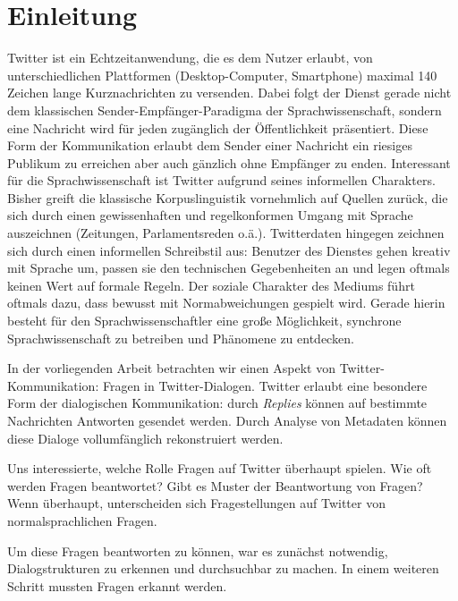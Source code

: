 \documentclass[main.tex]{subfiles}
\begin{document}
\section{Einleitung}

Twitter ist ein Echtzeitanwendung, die es dem Nutzer erlaubt, von unterschiedlichen Plattformen (Desktop-Computer, Smartphone) maximal 140 Zeichen lange Kurznachrichten zu versenden. Dabei folgt der Dienst gerade nicht dem klassischen Sender-Empfänger-Paradigma der Sprachwissenschaft, sondern eine Nachricht wird für jeden zugänglich der Öffentlichkeit präsentiert. Diese Form der Kommunikation erlaubt dem Sender einer Nachricht ein riesiges Publikum zu erreichen aber auch gänzlich ohne Empfänger zu enden. 
Interessant für die Sprachwissenschaft ist Twitter aufgrund seines informellen Charakters. Bisher greift die klassische Korpuslinguistik vornehmlich auf Quellen zurück, die sich durch einen gewissenhaften und regelkonformen Umgang mit Sprache auszeichnen (Zeitungen, Parlamentsreden o.ä.). Twitterdaten hingegen zeichnen sich durch einen informellen Schreibstil aus: Benutzer des Dienstes gehen kreativ mit Sprache um, passen sie den technischen Gegebenheiten an und legen oftmals keinen Wert auf formale Regeln. Der soziale Charakter des Mediums führt oftmals dazu, dass bewusst mit Normabweichungen gespielt wird. Gerade hierin besteht für den Sprachwissenschaftler eine große Möglichkeit, synchrone Sprachwissenschaft zu betreiben und Phänomene zu entdecken.

In der vorliegenden Arbeit betrachten wir einen Aspekt von Twitter-Kommunikation: Fragen in Twitter-Dialogen. Twitter erlaubt eine besondere Form der dialogischen Kommunikation: durch \textit{Replies} können auf bestimmte Nachrichten Antworten gesendet werden. Durch Analyse von Metadaten können diese Dialoge vollumfänglich rekonstruiert werden.

Uns interessierte, welche Rolle Fragen auf Twitter überhaupt spielen. Wie oft werden Fragen beantwortet? Gibt es Muster der Beantwortung von Fragen? Wenn überhaupt, unterscheiden sich Fragestellungen auf Twitter von normalsprachlichen Fragen.

Um diese Fragen beantworten zu können, war es zunächst notwendig, Dialogstrukturen zu erkennen und durchsuchbar zu machen. In einem weiteren Schritt mussten Fragen erkannt werden.
\end{document}
